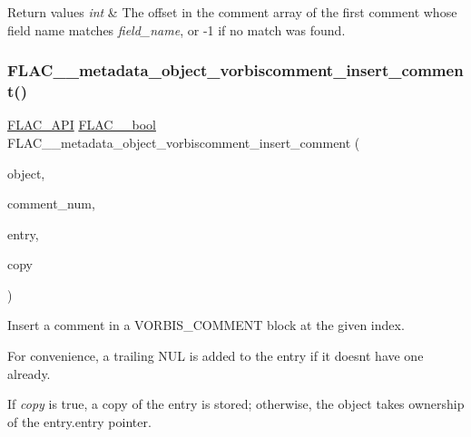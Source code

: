 \begin{DoxyRetVals}{Return values}
{\em int} & The offset in the comment array of the first comment whose field name matches {\itshape field\+\_\+name}, or {\ttfamily -\/1} if no match was found. \\
\hline
\end{DoxyRetVals}
\mbox{\label{group__flac__metadata__object_ga0c23f59f465f302b35a2d3ab1eae07e7}} 
\subsubsection{\texorpdfstring{FLAC\_\_metadata\_object\_vorbiscomment\_insert\_comment()}{FLAC\_\_metadata\_object\_vorbiscomment\_insert\_comment()}}
{\footnotesize\ttfamily \mbox{\hyperlink{group__flac__export_ga56ca07df8a23310707732b1c0007d6f5}{F\+L\+A\+C\+\_\+\+A\+PI}} \mbox{\hyperlink{ordinals_8h_a95103469f1cbd78b8cf250194985b34e}{F\+L\+A\+C\+\_\+\+\_\+bool}} F\+L\+A\+C\+\_\+\+\_\+metadata\+\_\+object\+\_\+vorbiscomment\+\_\+insert\+\_\+comment (\begin{DoxyParamCaption}\item[{\mbox{\hyperlink{struct_f_l_a_c_____stream_metadata}{F\+L\+A\+C\+\_\+\+\_\+\+Stream\+Metadata}} $\ast$}]{object,  }\item[{unsigned}]{comment\+\_\+num,  }\item[{\mbox{\hyperlink{struct_f_l_a_c_____stream_metadata___vorbis_comment___entry}{F\+L\+A\+C\+\_\+\+\_\+\+Stream\+Metadata\+\_\+\+Vorbis\+Comment\+\_\+\+Entry}}}]{entry,  }\item[{\mbox{\hyperlink{ordinals_8h_a95103469f1cbd78b8cf250194985b34e}{F\+L\+A\+C\+\_\+\+\_\+bool}}}]{copy }\end{DoxyParamCaption})}

Insert a comment in a V\+O\+R\+B\+I\+S\+\_\+\+C\+O\+M\+M\+E\+NT block at the given index.

For convenience, a trailing N\+UL is added to the entry if it doesn\textquotesingle{}t have one already.

If {\itshape copy} is {\ttfamily true}, a copy of the entry is stored; otherwise, the object takes ownership of the {\ttfamily entry.\+entry} pointer.

